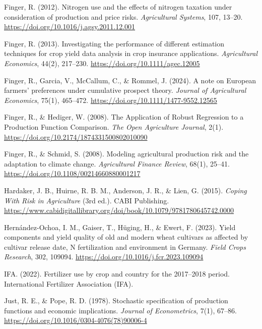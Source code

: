 \documentclass[12pt,a4paper]{article}
\begin{document}
\begin{description}
\item Finger, R. (2012). Nitrogen use and the effects of nitrogen taxation under consideration of production and price risks. \textit{Agricultural Systems}, 107, 13--20. \url{https://doi.org/10.1016/j.agsy.2011.12.001}

\item Finger, R. (2013). Investigating the performance of different estimation techniques for crop yield data analysis in crop insurance applications. \textit{Agricultural Economics}, 44(2), 217--230. \url{https://doi.org/10.1111/agec.12005}

\item Finger, R., Garcia, V., McCallum, C., \& Rommel, J. (2024). A note on European farmers' preferences under cumulative prospect theory. \textit{Journal of Agricultural Economics}, 75(1), 465--472. \url{https://doi.org/10.1111/1477-9552.12565}

\item Finger, R., \& Hediger, W. (2008). The Application of Robust Regression to a Production Function Comparison. \textit{The Open Agriculture Journal}, 2(1). \url{https://doi.org/10.2174/1874331500802010090}

\item Finger, R., \& Schmid, S. (2008). Modeling agricultural production risk and the adaptation to climate change. \textit{Agricultural Finance Review}, 68(1), 25--41. \url{https://doi.org/10.1108/00214660880001217}

\item Hardaker, J. B., Huirne, R. B. M., Anderson, J. R., \& Lien, G. (2015). \textit{Coping With Risk in Agriculture} (3rd ed.). CABI Publishing. \url{https://www.cabidigitallibrary.org/doi/book/10.1079/9781780645742.0000}

\item Hern\'{a}ndez-Ochoa, I. M., Gaiser, T., H\"{u}ging, H., \& Ewert, F. (2023). Yield components and yield quality of old and modern wheat cultivars as affected by cultivar release date, N fertilization and environment in Germany. \textit{Field Crops Research}, 302, 109094. \url{https://doi.org/10.1016/j.fcr.2023.109094}

\item IFA. (2022). Fertilizer use by crop and country for the 2017--2018 period. International Fertilizer Association (IFA).

\item Just, R. E., \& Pope, R. D. (1978). Stochastic specification of production functions and economic implications. \textit{Journal of Econometrics}, 7(1), 67--86. \url{https://doi.org/10.1016/0304-4076(78)90006-4}


\end{description}
\end{document}
